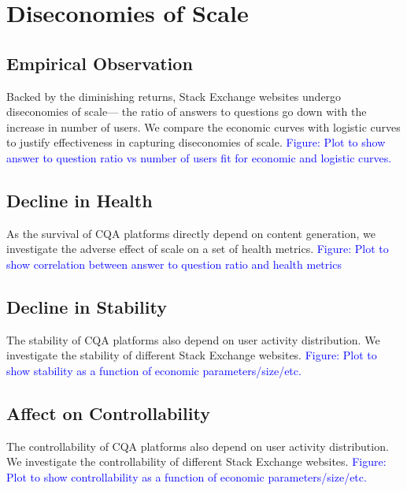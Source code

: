 \section{Diseconomies of Scale}
\subsection{Empirical Observation}
Backed by the diminishing returns, Stack Exchange websites undergo diseconomies of scale--- the ratio of answers to questions go down with the increase in number of users. We compare the economic curves with logistic curves to justify effectiveness in capturing diseconomies of scale. \textcolor{blue}{Figure: Plot to show answer to question ratio vs number of users fit for economic and logistic curves.}

\subsection{Decline in Health} As the survival of CQA platforms directly depend on content generation, we investigate the adverse effect of scale on a set of health metrics. \textcolor{blue}{Figure: Plot to show correlation between answer to question ratio and health metrics}

\subsection{Decline in Stability} The stability of CQA platforms also depend on user activity distribution. We investigate the stability of different Stack Exchange websites. \textcolor{blue}{Figure: Plot to show stability as a function of economic parameters/size/etc.}

\subsection{Affect on Controllability} The controllability of CQA platforms also depend on user activity distribution. We investigate the controllability of different Stack Exchange websites. \textcolor{blue}{Figure: Plot to show controllability as a function of economic parameters/size/etc.}